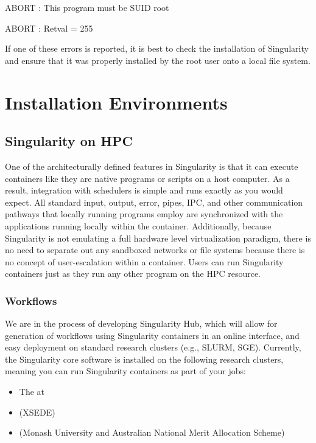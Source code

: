 \documentclass[letterpaper,10pt,english]{sphinxmanual}
\begin{document}
%
\begin{sphinxVerbatim}[commandchars=\\\{\}]
ABORT  : This program must be SUID root

ABORT  : Retval = 255
\end{sphinxVerbatim}

If one of these errors is reported, it is best to check the installation
of Singularity and ensure that it was properly installed by the root
user onto a local file system.


\chapter{Installation Environments}
\label{\detokenize{installation_environments:installation-environments}}\label{\detokenize{installation_environments::doc}}

\section{Singularity on HPC}
\label{\detokenize{installation_environments:singularity-on-hpc}}
One of the architecturally defined features in Singularity is that it
can execute containers like they are native programs or scripts on a
host computer. As a result, integration with schedulers is simple and
runs exactly as you would expect. All standard input, output, error,
pipes, IPC, and other communication pathways that locally running
programs employ are synchronized with the applications running locally
within the container.
Additionally, because Singularity is not emulating a full hardware
level virtualization paradigm, there is no need to separate out any
sandboxed networks or file systems because there is no concept of
user-escalation within a container. Users can run Singularity
containers just as they run any other program on the HPC resource.


\subsection{Workflows}
\label{\detokenize{installation_environments:workflows}}
We are in the process of developing Singularity Hub, which will allow
for generation of workflows using Singularity containers in an online
interface, and easy deployment on standard research clusters (e.g.,
SLURM, SGE). Currently, the Singularity core software is installed on
the following research clusters, meaning you can run Singularity
containers as part of your jobs:
\begin{itemize}
\item {} 
The  at 

\item {} 
 (XSEDE)

\item {} 
(Monash University and Australian National Merit Allocation Scheme)

\end{itemize}
\end{document}
